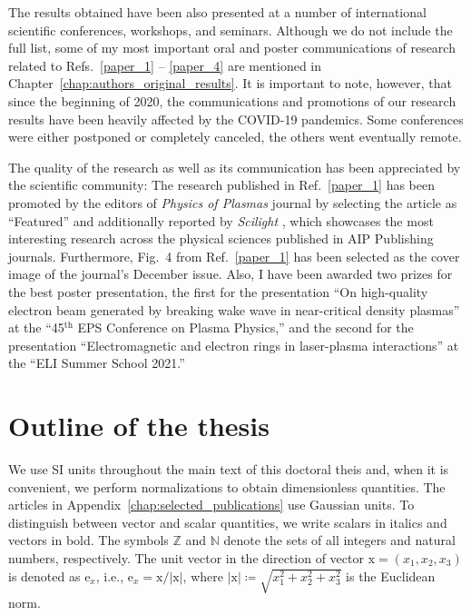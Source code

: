 \documentclass[10pt, a4paper, twoside, openright]{report}
\newcommand{\q}[1]{``#1''} %
\newcommand{\norm}[1]{|#1|}
\renewcommand{\vec}[1]{\boldsymbol{\mathrm{#1}}}
\begin{document}
The results obtained have been also presented at a number of international scientific conferences, workshops, and seminars. Although we do not include the full list, some of my most important oral and poster communications of research related to Refs.~\ref{paper_1} -- \ref{paper_4} are mentioned in Chapter~\ref{chap:authors_original_results}. It is important to note, however, that since the beginning of 2020, the communications and promotions of our research results have been heavily affected by the COVID-19 pandemics. Some conferences were either postponed or completely canceled, the others went eventually remote.

The quality of the research as well as its communication has been appreciated by the scientific community: The research published in Ref.~\ref{paper_1} has been promoted by the editors of \textit{Physics of Plasmas} journal by selecting the article as \q{Featured} and additionally reported by \textit{Scilight} \cite{Patrick2021}, which showcases the most interesting research across the physical sciences published in AIP Publishing journals. Furthermore, Fig.~4 from Ref.~\ref{paper_1} has been selected as the cover image of the journal's December issue. Also, I have been awarded two prizes for the best poster presentation, the first for the presentation \q{On high-quality electron beam generated by breaking wake wave in near-critical density plasmas} at the \q{45$ ^{\mathrm{th}} $ EPS Conference on Plasma Physics,} and the second for the presentation \q{Electromagnetic and electron rings in laser-plasma interactions} at the \q{ELI Summer School 2021.} 

\section{Outline of the thesis}
%

We use SI units throughout the main text of this doctoral theis and, when it is convenient, we perform normalizations to obtain dimensionless quantities. The articles in Appendix~\ref{chap:selected_publications} use Gaussian units. To distinguish between vector and scalar quantities, we write scalars in italics and vectors in bold. The symbols $ \mathbb{Z} $ and $ \mathbb{N} $ denote the sets of all integers and natural numbers, respectively. The unit vector in the direction of vector $ \vec{x} = \left( x_1, x_2, x_3 \right) $ is denoted as $ \vec{e}_{x} $, i.e., $ \vec{e}_{x} = \vec{x} / \norm{\vec{x}} $, where $ \norm{\vec{x}} \coloneq \sqrt{x_1^2 + x_2^2 + x_3^2} $ is the Euclidean norm. 
\end{document}
